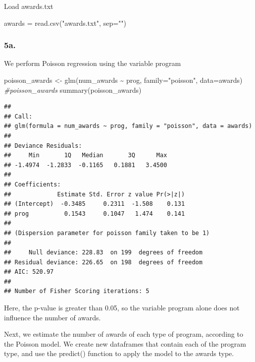 \documentclass[
]{article}
\newenvironment{Shaded}{\begin{snugshade}}{\end{snugshade}}
\newcommand{\AttributeTok}[1]{\textcolor[rgb]{0.77,0.63,0.00}{#1}}
\newcommand{\CommentTok}[1]{\textcolor[rgb]{0.56,0.35,0.01}{\textit{#1}}}
\newcommand{\FunctionTok}[1]{\textcolor[rgb]{0.00,0.00,0.00}{#1}}
\newcommand{\NormalTok}[1]{#1}
\newcommand{\OtherTok}[1]{\textcolor[rgb]{0.56,0.35,0.01}{#1}}
\newcommand{\SpecialCharTok}[1]{\textcolor[rgb]{0.00,0.00,0.00}{#1}}
\newcommand{\StringTok}[1]{\textcolor[rgb]{0.31,0.60,0.02}{#1}}
\begin{document}
Load awards.txt

\begin{Shaded}
\begin{Highlighting}[]
\NormalTok{awards }\OtherTok{=} \FunctionTok{read.csv}\NormalTok{(}\StringTok{"awards.txt"}\NormalTok{, }\AttributeTok{sep=}\StringTok{""}\NormalTok{)}
\end{Highlighting}
\end{Shaded}

\hypertarget{a.-2}{%
\subsubsection{5a.}\label{a.-2}}

We perform Poisson regression using the variable program

\begin{Shaded}
\begin{Highlighting}[]
\NormalTok{poisson\_awards }\OtherTok{\textless{}{-}} \FunctionTok{glm}\NormalTok{(num\_awards }\SpecialCharTok{\textasciitilde{}}\NormalTok{ prog, }\AttributeTok{family=}\StringTok{"poisson"}\NormalTok{, }\AttributeTok{data=}\NormalTok{awards)}
\CommentTok{\#poisson\_awards}
\FunctionTok{summary}\NormalTok{(poisson\_awards)}
\end{Highlighting}
\end{Shaded}

\begin{verbatim}
## 
## Call:
## glm(formula = num_awards ~ prog, family = "poisson", data = awards)
## 
## Deviance Residuals: 
##     Min       1Q   Median       3Q      Max  
## -1.4974  -1.2833  -0.1165   0.1881   3.4500  
## 
## Coefficients:
##             Estimate Std. Error z value Pr(>|z|)
## (Intercept)  -0.3485     0.2311  -1.508    0.131
## prog          0.1543     0.1047   1.474    0.141
## 
## (Dispersion parameter for poisson family taken to be 1)
## 
##     Null deviance: 228.83  on 199  degrees of freedom
## Residual deviance: 226.65  on 198  degrees of freedom
## AIC: 520.97
## 
## Number of Fisher Scoring iterations: 5
\end{verbatim}

Here, the p-value is greater than 0.05, so the variable program alone
does not influence the number of awards.

Next, we estimate the number of awards of each type of program,
according to the Poisson model. We create new dataframes that contain
each of the program type, and use the predict() function to apply the
model to the awards type.
\end{document}
